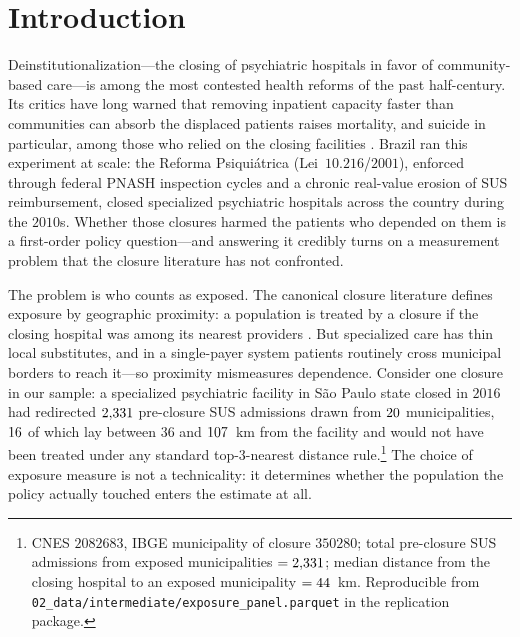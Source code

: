 \section{Introduction}
\label{sec:introduction}

Deinstitutionalization---the closing of psychiatric hospitals in favor
of community-based care---is among the most contested health reforms of
the past half-century. Its critics have long warned that removing
inpatient capacity faster than communities can absorb the displaced
patients raises mortality, and suicide in particular, among those who
relied on the closing facilities
\citep{yoonBruckner2009, bastiampillai2016, pirkola2009}.
Brazil ran this experiment at scale: the Reforma Psiquiátrica
(Lei~$10.216$/$2001$), enforced through federal PNASH inspection
cycles and a chronic real-value erosion of SUS reimbursement, closed
specialized psychiatric hospitals across the country during the
$2010$s. Whether those closures harmed the patients who depended on
them is a first-order policy question---and answering it credibly turns
on a measurement problem that the closure literature has not confronted.

The problem is who counts as exposed. The canonical closure literature
defines exposure by geographic proximity: a population is treated by a
closure if the closing hospital was among its nearest providers
\citep{avdic2016, carroll2019, joynt2015, gujralBasu2019, lindrooth2018}.
But specialized care has thin local substitutes, and in a single-payer
system patients routinely cross municipal borders to reach it---so
proximity mismeasures dependence. Consider one closure in our sample: a
specialized psychiatric facility in São Paulo state closed in $2016$
had redirected $2{,}331$ pre-closure SUS admissions drawn from
$20$ municipalities, $16$ of which lay between $36$ and $107$~km from
the facility and would not have been treated under any standard
top-$3$-nearest distance rule.\footnote{CNES $2082683$, IBGE
municipality of closure $350280$; total pre-closure SUS admissions
from exposed municipalities $= 2{,}331$; median distance from the closing hospital to an
exposed municipality $= 44$~km. Reproducible from
\texttt{02\_data/intermediate/exposure\_panel.parquet} in the
replication package.} The choice of exposure measure is not a
technicality: it determines whether the population the policy actually
touched enters the estimate at all.

